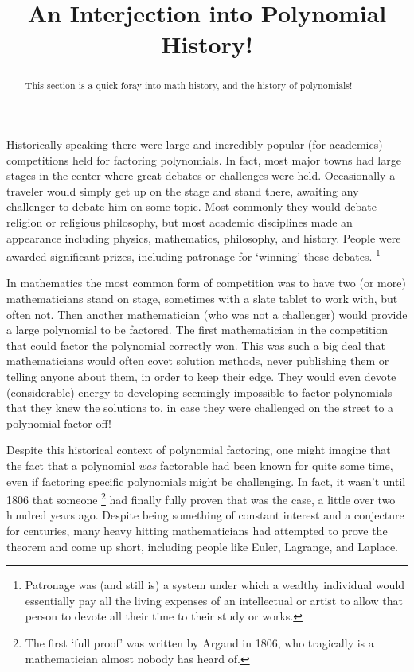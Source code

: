 \documentclass{ximera}
\title{An Interjection into Polynomial History!}
\begin{document}
\begin{abstract}
    This section is a quick foray into math history, and the history of polynomials!
\end{abstract}
\maketitle

Historically speaking there were large and incredibly popular (for academics) competitions held for factoring polynomials. In fact, most major towns had large stages in the center where great debates or challenges were held. Occasionally a traveler would simply get up on the stage and stand there, awaiting any challenger to debate him on some topic. Most commonly they would debate religion or religious philosophy, but most academic disciplines made an appearance including physics, mathematics, philosophy, and history. People were awarded significant prizes, including patronage for `winning' these debates.%
\footnote{Patronage was (and still is) a system under which a wealthy individual would essentially pay all the living expenses of an intellectual or artist to allow that person to devote all their time to their study or works.}

In mathematics the most common form of competition was to have two (or more) mathematicians stand on stage, sometimes with a slate tablet to work with, but often not. Then another mathematician (who was not a challenger) would provide a large polynomial to be factored. The first mathematician in the competition that could factor the polynomial correctly won. This was such a big deal that mathematicians would often covet solution methods, never publishing them or telling anyone about them, in order to keep their edge. They would even devote (considerable) energy to developing seemingly impossible to factor polynomials that they knew the solutions to, in case they were challenged on the street to a polynomial factor-off!
    
Despite this historical context of polynomial factoring, one might imagine that the fact that a polynomial \textit{was} factorable had been known for quite some time, even if factoring specific polynomials might be challenging. In fact, it wasn't until 1806 that someone%
\footnote{The first `full proof' was written by Argand in 1806, who tragically is a mathematician almost nobody has heard of.}
had finally fully proven that was the case, a little over two hundred years ago. Despite being something of constant interest and a conjecture for centuries, many heavy hitting mathematicians had attempted to prove the theorem and come up short, including people like Euler, Lagrange, and Laplace.\\
\end{document}
